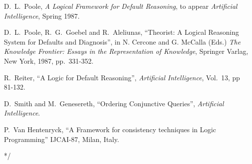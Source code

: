 \begin{thebibliography}{McDer80}
D.\ L.\ Poole,
{\it A Logical Framework for Default Reasoning},
to appear {\em Artificial Intelligence}, Spring 1987.

D.\ L.\ Poole, R.\ G.\ Goebel and R.\ Aleliunas,
``Theorist: A Logical Reasoning System for Defaults and Diagnosis'',
in N. Cercone and G. McCalla (Eds.)
{\it The Knowledge Frontier: Essays in the Representation of
Knowledge},
Springer Varlag, New York, 1987, pp.\ 331-352.

R.\ Reiter,
``A Logic for Default Reasoning'',
{\em Artificial Intelligence},
Vol.\ 13, pp 81-132.

D.~Smith and M.~Genesereth,
``Ordering Conjunctive Queries'',
{\em Artificial Intelligence}.

P.\ Van Hentenryck,
``A Framework for consistency techniques in Logic Programming''
IJCAI-87, Milan, Italy.
\end{thebibliography}
\printindex

*/



